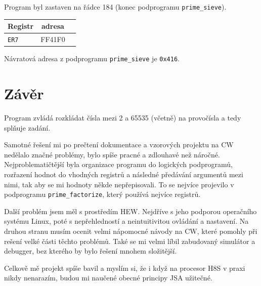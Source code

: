 \documentclass[12pt]{article}
\newcommand{\code}[1]{\mbox{\texttt{#1}}}
\begin{document}
Program byl zastaven na řádce 184 (konec podprogramu \code{prime\_sieve}).

\begin{table}[H]
	\centering
	\begin{tabular}{|l|c|r|}
		\hline
		Registr    & adresa \\ \hline
		\code{ER7} & FF41F0 \\ \hline
	\end{tabular}
\end{table}



Návratová adresa z podprogramu \code{prime\_sieve} je \code{0x416}.

\section{Závěr}

Program zvládá rozkládat čísla mezi 2 a 65535 (včetně) na provočísla a tedy
splňuje zadání.

Samotné řešení mi po prečtení dokumentace a vzorových projektu na CW nedělalo
značné problémy, bylo spíše pracné a zdlouhavé než náročné. Nejproblematičtější
byla organizace programu do logických podprogramů, rozřazení hodnot do vhodných
registrů a následné předávání argumentů mezi nimi, tak aby se mi hodnoty někde
nepřepisovali. To se nejvíce projevilo v podprogramu \code{prime\_factorize},
který používá nejvíce registrů.

Další problém jsem měl s prostředím HEW. Nejdříve s jeho podporou operačního
systému Linux, poté s nepřehledností a neintuitivitou ovládání a nastavení. Na
druhou stranu musím ocenit velmi nápomocné návody na CW, které pomohly při
rešení velké části těchto problémů. Také se mi velmi líbil zabudovaný simulátor
a debugger, bez kterého by bylo řešení mnohem složitější.

Celkově mě projekt spíše bavil a myslím si, že i když na procesor H8S v praxi
nikdy nenarazím, budou mi naučené obecné principy JSA užitečné.
\end{document}
